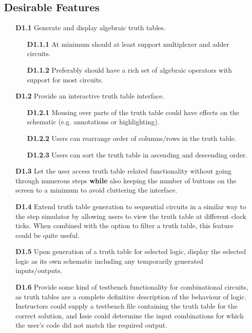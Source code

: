 \subsection*{Desirable Features}
\begin{itemize}
    \item[\textbf{D1.1}] Generate and display algebraic truth tables.
    \begin{itemize}
        \item[\textbf{D1.1.1}] At minimum should at least support multiplexer and adder circuits.
        \item[\textbf{D1.1.2}] Preferably should have a rich set of algebraic operators with support for most circuits.
    \end{itemize}
    \medskip
    \item[\textbf{D1.2}] Provide an interactive truth table interface.
    \begin{itemize}
        \item[\textbf{D1.2.1}] Mousing over parts of the truth table could have effects on the schematic (e.g. annotations or highlighting).
        \item[\textbf{D1.2.2}] Users can rearrange order of columns/rows in the truth table.
        \item[\textbf{D1.2.3}] Users can sort the truth table in ascending and descending order.
    \end{itemize}
    \medskip
    \item[\textbf{D1.3}] Let the user access truth table related functionality without going through numerous steps \textbf{while} also keeping the number of buttons on the screen to a minimum to avoid cluttering the interface. 
    \medskip
    \item[\textbf{D1.4}] Extend truth table generation to sequential circuits in a similar way to the step simulator by allowing users to view the truth table at different clock ticks. When combined with the option to filter a truth table, this feature could be quite useful.
    \medskip
    \item[\textbf{D1.5}] Upon generation of a truth table for selected logic, display the selected logic as its own schematic including any temporarily generated inputs/outputs.
    \medskip
    \item[\textbf{D1.6}] Provide some kind of testbench functionality for combinational circuits, as truth tables are a complete definitive description of the behaviour of logic. Instructors could supply a testbench file containing the truth table for the correct solution, and Issie could determine the input combinations for which the user's code did not match the required output.
    \medskip
\end{itemize}

